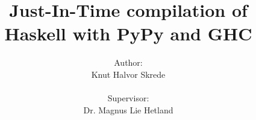 \documentclass[12pt,a4paper]{book}
\begin{document}
\title{Just-In-Time compilation of\\Haskell with PyPy and GHC}
\author{Author:\\
Knut Halvor Skrede\\
\\
Supervisor:
\\
Dr. Magnus Lie Hetland}


\begin{titlepage}
\maketitle
\end{titlepage}


\clearpage

\clearpage

\setcounter{tocdepth}{2}
\tableofcontents
\clearpage

\pagestyle{plain}
\setcounter{page}{1}



%




%
%


%

\clearpage



\clearpage
\appendix
\appendixpage



\end{document}
